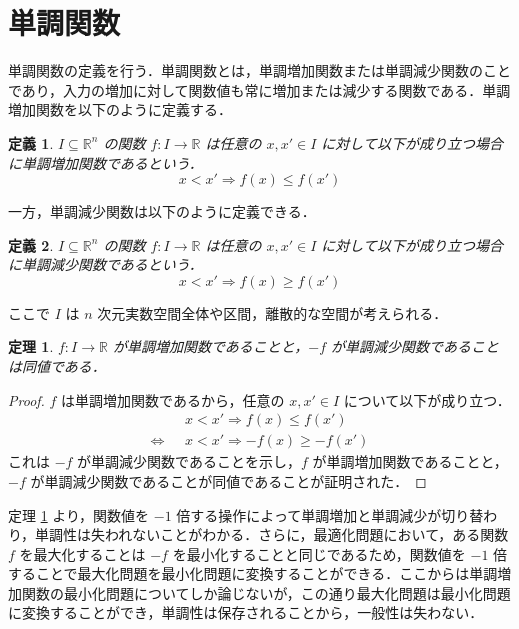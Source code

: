 \documentclass[a4paper,11pt]{jreport}
\newtheorem{definition}{定義}
\newtheorem{theorem}{定理}
\begin{document}
\section{単調関数}

単調関数の定義を行う．単調関数とは，単調増加関数または単調減少関数のことであり，入力の増加に対して関数値も常に増加または減少する関数である．単調増加関数を以下のように定義する．

\begin{definition}
$ I \subseteq \mathbb{R}^n $ の関数 $ f : I \to \mathbb{R} $ は任意の $ x, x' \in I $ に対して以下が成り立つ場合に単調増加関数であるという．
$$ x < x' \Rightarrow f(x) \leq f(x') $$
\end{definition}

一方，単調減少関数は以下のように定義できる．

\begin{definition}
$ I \subseteq \mathbb{R}^n $ の関数 $ f : I \to \mathbb{R} $ は任意の $ x, x' \in I $ に対して以下が成り立つ場合に単調減少関数であるという．
$$ x < x' \Rightarrow f(x) \geq f(x') $$
\end{definition}

ここで $ I $ は $ n $ 次元実数空間全体や区間，離散的な空間が考えられる．

\begin{theorem} \label{thm:keeping_monotonicity}
$ f : I \to \mathbb{R} $ が単調増加関数であることと，$ -f $ が単調減少関数であることは同値である．
\end{theorem}

\begin{proof}
$ f $ は単調増加関数であるから，任意の $ x, x' \in I $ について以下が成り立つ．
\begin{align*}
& x < x' \Rightarrow f(x) \leq f(x') \\
\Longleftrightarrow \hspace{8pt} & x < x' \Rightarrow -f(x) \geq -f(x')
\end{align*}
これは $ -f $ が単調減少関数であることを示し，$ f $ が単調増加関数であることと，$ -f $ が単調減少関数であることが同値であることが証明された．
\end{proof}

定理 \ref{thm:keeping_monotonicity} より，関数値を $ -1 $ 倍する操作によって単調増加と単調減少が切り替わり，単調性は失われないことがわかる．さらに，最適化問題において，ある関数 $ f $ を最大化することは $ -f $ を最小化することと同じであるため，関数値を $ -1 $ 倍することで最大化問題を最小化問題に変換することができる．ここからは単調増加関数の最小化問題についてしか論じないが，この通り最大化問題は最小化問題に変換することができ，単調性は保存されることから，一般性は失わない．\par
\end{document}
